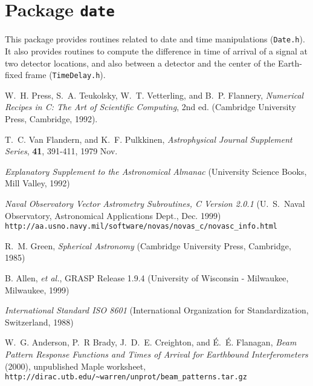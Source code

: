
\chapter{Package \texttt{date}}

This package provides routines related to date and time manipulations
(\texttt{Date.h}).  It also provides routines to compute the
difference in time of arrival of a signal at two detector locations,
and also between a detector and the center of the Earth-fixed frame
(\texttt{TimeDelay.h}).

\newpage

\newpage

\newpage\begin{thebibliography}{1}
  
  W.~H. Press, S.~A. Teukolsky, W.~T. Vetterling, and B.~P. Flannery,
  \textit{Numerical Recipes in C: The Art of Scientific Computing}, 2nd ed.
  (Cambridge University Press, Cambridge, 1992).

  T.~C. Van Flandern, and K.~F. Pulkkinen, 
  \textit{Astrophysical Journal Supplement Series}, \textbf{41},
  391-411, 1979 Nov.
  
  \textit{Explanatory Supplement to the Astronomical Almanac} (University
  Science Books, Mill Valley, 1992)

  \textit{Naval Observatory Vector Astrometry Subroutines, C Version 2.0.1}
  (U.~S.~Naval Observatory, Astronomical Applications Dept., Dec. 1999)
  \verb+http://aa.usno.navy.mil/software/novas/novas_c/novasc_info.html+
  
  R.~M. Green, \textit{Spherical Astronomy} (Cambridge University Press,
  Cambridge, 1985)
  
  B. Allen, \textit{et al.}, GRASP Release 1.9.4 (University of Wisconsin
  - Milwaukee, Milwaukee, 1999)
  
  \textit{International Standard ISO 8601} (International Organization for
  Standardization, Switzerland, 1988)
  
  W.~G. Anderson, P.~R Brady, J.~D.~E. Creighton, and \'E.~\'E. Flanagan,
  \emph{Beam Pattern Response Functions and Times of Arrival for Earthbound Interferometers} 
  (2000), unpublished Maple worksheet,
  \verb+http://dirac.utb.edu/~warren/unprot/beam_patterns.tar.gz+
  
\end{thebibliography}

